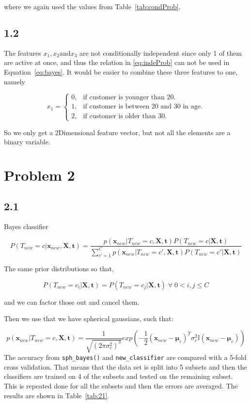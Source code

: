 \documentclass[table,xcdraw]{article}
\begin{document}
where we again used the values from Table~\ref{tab:condProb}.



\subsection*{1.2}

The features $x_1,x_2 \text{and} x_3$ are not conditionally independent since only 1 of them are active at once, and thus the relation in \eqref{eq:indeProb} can not be used in Equation~\eqref{eq:bayes}. It would be easier to combine these three features to one, namely

\[
    x_1= 
\begin{cases}
    0, & \text{if customer is younger than 20.} \\
    1, & \text{if customer is between 20 and 30 in age.}\\
    2, & \text{if customer is older than 30.}
\end{cases}
\]

So we only get a 2Dimensional feature vector, but not all the elements are a binary variable.
 
\newpage 

\section*{Problem 2}
\subsection*{2.1}

Bayes classifier 

\begin{equation}
P(T_{new}=c|\bm{x}_{new},\bm{X},\bm{t})= \frac{p(\bm{x}_{new}|T_{new}=c,\bm{X},\bm{t})P(T_{new}=c|\bm{X},\bm{t})}{\sum_{c'=1}^{C}p(\bm{x}_{new}|T_{new}=c',\bm{X},\bm{t})P(T_{new}=c'|\bm{X},\bm{t})}
\end{equation}

The same prior distributions so that, 

\begin{equation}
P(T_{new}=c_i|\bm{X},\bm{t}) = P(T_{new}=c_j|\bm{X},\bm{t})\; \forall \; 0 < i,j \leq C
\end{equation}

and we can factor those out and cancel them.

Then we use that we have spherical gaussians, such that:

\begin{equation}
p(\bm{x}_{new}|T_{new}=c,\bm{X},\bm{t}) = \frac{1}{\sqrt{(2\pi\sigma_c^2)^3}}exp{\left(-\frac{1}{2}(\bm{x}_{new}-\bm{\mu}_c)^{T}\sigma_c^2 \mathbb{I} (\bm{x}_{new}-\bm{\mu}_c) \right)}
\end{equation}
\newline
\noindent The accuracy from \verb|sph_bayes()| and \verb|new_classifier| are compared with a 5-fold cross validation. That means that the data set is split into 5 subsets and then the classifiers are trained on 4 of the subsets and tested on the remaining subset. This is repeated done for all the subsets and then the errors are averaged. The results are shown in Table~\ref{tab:21}.
\end{document}
